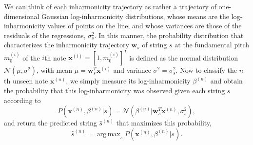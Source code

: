 \documentclass[12pt]{cmuthesis}
\DeclareMathOperator*{\argmax}{arg\,max}
\begin{document}
We can think of each inharmonicity trajectory as rather a trajectory of one-dimensional Gaussian log-inharmonicity distributions, whose means are the log-inharmonicity values of points on the line, and whose variances are those of the residuals of the regressions, $\sigma_s^2$. In this manner, the probability distribution that characterizes the inharmonicity trajectory $\mathbf{w}_s$ of string $s$ at the fundamental pitch $m_0^{(i)}$ of the $i$th note $\mathbf{x}^{(i)} = [1,m_0^{(i)}]^T$ is defined as the normal distribution $\mathcal{N}(\mu, \sigma^2)$, with mean $\mu = \mathbf{w}_s^T\mathbf{x}^{(i)}$ and variance $\sigma^2 = \sigma_s^2$. Now to classify the $n$th unseen note $\mathbf{x}^{(n)}$, we simply measure its log-inharmonicity $\beta^{(n)}$ and obtain the probability that this log-inharmonicity was observed given each string $s$ according to
\begin{equation}
P(\mathbf{x}^{(n)},\beta^{(n)} | s) = \mathcal{N}(\beta^{(n)} | \mathbf{w}_s^T\mathbf{x}^{(n)},\sigma_s^2),
\end{equation}
and return the predicted string $\hat{s}^{(n)}$ that maximizes this probability,
\begin{equation}
\hat{s}^{(n)} = \argmax_{s}P(\mathbf{x}^{(n)},\beta^{(n)} | s).
\label{eq:string-argmax}
\end{equation}

 


\end{document}
